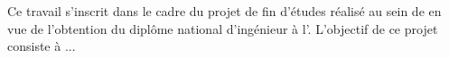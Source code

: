 \sloppy


Ce travail s’inscrit dans le cadre du projet de fin d’études réalisé au sein de  en vue de l’obtention du diplôme national d’ingénieur à l’\IMIE. L’objectif de ce projet consiste à ... \\

